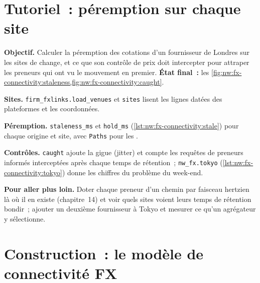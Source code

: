 \section{Tutoriel~: péremption sur chaque site}\label{tut:nw:fx-connectivity:tut}

\begin{tutorial}
\textbf{Objectif.} Calculer la péremption des cotations d'un fournisseur de Londres sur les sites de change, et ce que son contrôle de prix doit intercepter pour attraper les preneurs
qui ont vu le mouvement en premier. \textbf{État final~:} les \cref{fig:nw:fx-connectivity:staleness,fig:nw:fx-connectivity:caught}.
\begin{tutsteps}
\item \textbf{Sites.} \texttt{firm\_fxlinks.load\_venues} et \texttt{sites} lisent les lignes datées des plateformes et les coordonnées.
\item \textbf{Péremption.} \texttt{staleness\_ms} et \texttt{hold\_ms} (\cref{lst:nw:fx-connectivity:stale}) pour chaque origine et
  site, avec \texttt{Paths} pour les .
\item \textbf{Contrôles.} \texttt{caught} ajoute la gigue (jitter) et compte les requêtes de preneurs informés interceptées après chaque temps de rétention~; \texttt{nw\_fx.tokyo}
  (\cref{lst:nw:fx-connectivity:tokyo}) donne les chiffres du problème du week-end.
\end{tutsteps}
\textbf{Pour aller plus loin.} Doter chaque preneur d'un chemin par faisceau hertzien là où il en existe (chapitre~14) et voir quels sites voient leurs temps de rétention bondir~; ajouter un
deuxième fournisseur à Tokyo et mesurer ce qu'un agrégateur y sélectionne.
\end{tutorial}

\section{Construction~: le modèle de connectivité FX}\label{bld:nw:fx-connectivity:fxlinks}

